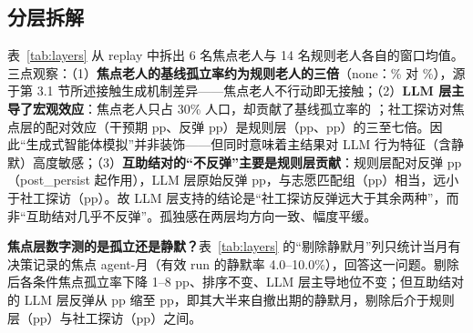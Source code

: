 \documentclass[10.5pt,twocolumn]{ctexart}
\begin{document}
\subsection{分层拆解}\label{sec:layers}
表~\ref{tab:layers} 从 replay 中拆出 6 名焦点老人与 14 名规则老人各自的窗口均值。三点观察：（1）\textbf{焦点老人的基线孤立率约为规则老人的三倍}（none：\FocIvNone\% 对 \RulIvNone\%），源于第 3.1 节所述接触生成机制差异——焦点老人不行动即无接触；（2）\textbf{LLM 层主导了宏观效应}：焦点老人只占 30\% 人口，却贡献了基线孤立率的 \FocShareNone；社工探访对焦点层的配对效应（干预期 \PFocIvCw pp、反弹 \PFocRebCw pp）是规则层（\PRulIvCw pp、\PRulRebCw pp）的三至七倍。因此``生成式智能体模拟''并非装饰——但同时意味着主结果对 LLM 行为特征（含静默）高度敏感；（3）\textbf{互助结对的``不反弹''主要是规则层贡献}：规则层配对反弹 \PRulRebTb pp（post\_persist 起作用），LLM 层原始反弹 \PFocRebTb pp，与志愿匹配组（\PFocRebPf pp）相当，远小于社工探访（\PFocRebCw pp）。故 LLM 层支持的结论是``社工探访反弹远大于其余两种''，而非``互助结对几乎不反弹''。孤独感在两层均方向一致、幅度平缓。

\textbf{焦点层数字测的是孤立还是静默？}表~\ref{tab:layers} 的``剔除静默月''列只统计当月有决策记录的焦点 agent-月（有效 run 的静默率 4.0--10.0\%），回答这一问题。剔除后各条件焦点孤立率下降 1--8 pp、排序不变、LLM 层主导地位不变；但互助结对的 LLM 层反弹从 \PFocRebTb pp 缩至 \PFocActRebTb pp，即其大半来自撤出期的静默月，剔除后介于规则层（\PRulRebTb pp）与社工探访（\PFocActRebCw pp）之间。
\end{document}
